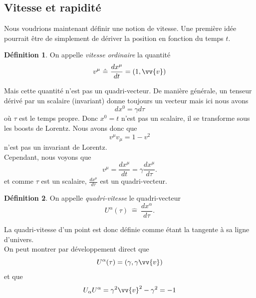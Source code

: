 \documentclass[a4paper,11pt]{report}
\theoremstyle{definition}
\theoremstyle{plain}
\theoremstyle{definition}
\newtheorem{defn}{Définition}[chapter]
\theoremstyle{remark}
\begin{document}
        \subsection{Vitesse et rapidité}
        
            Nous voudrions maintenant définir une notion de vitesse. Une première idée pourrait être de simplement de dériver la position en fonction du temps $t$.
            \begin{defn}
                On appelle \textit{vitesse ordinaire} la quantité
                \begin{equation}
                v^\mu ~\hat{=}~ \frac{dx^\mu}{dt} = (1,\vv{v})
                \end{equation}
            \end{defn}
            Mais cette quantité n'est pas un quadri-vecteur. De manière générale, un tenseur dérivé par un scalaire (invariant) donne toujours un vecteur mais ici nous avons
            \begin{equation}
                dx^0 = \gamma d\tau
            \end{equation}
            où $\tau$ est le temps propre. Donc $x^0 = t$ n'est pas un scalaire, il se transforme sous les boosts de Lorentz. Nous avons donc que 
            \begin{equation}
                v^\mu v_\mu = 1-v^2 
            \end{equation}
            n'est pas un invariant de Lorentz.\\
            Cependant, nous voyons que
            \begin{equation}
                v^\mu = \frac{dx^\mu}{dt} = \gamma \frac{dx^\mu}{d\tau}.
            \end{equation}
            et comme $\tau$ est un scalaire, $\frac{dx^\mu}{d\tau}$ est un quadri-vecteur.
            \begin{defn}
                On appelle \textit{quadri-vitesse} le quadri-vecteur
                \begin{equation}
                    U^\alpha(\tau) ~\hat{=}~ \frac{dx^\alpha}{d\tau}.
                \end{equation}
            \end{defn}
            La quadri-vitesse d'un point est donc définie comme étant la tangente à sa ligne d'univers.\\
            On peut montrer par développement direct que 
            \begin{equation}
                U^\alpha(\tau) = (\gamma,\gamma\vv{v})
            \end{equation}
            et que 
            \begin{equation}
                U_\alpha U^\alpha = \gamma^2\vv{v}^2-\gamma^2 = -1
            \end{equation}
        
\end{document}
